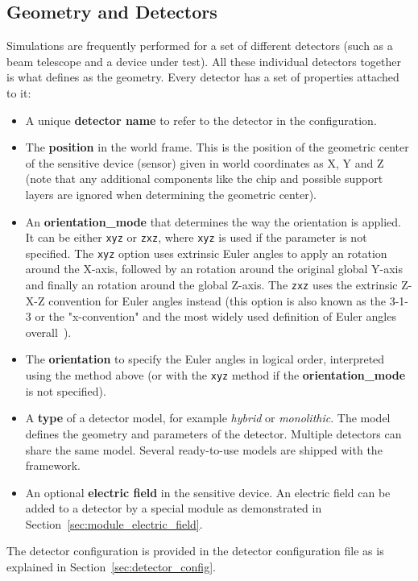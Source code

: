 \subsection{Geometry and Detectors}
\label{sec:models_geometry}
Simulations are frequently performed for a set of different detectors (such as a beam telescope and a device under test).
All these individual detectors together is what \apsq defines as the geometry.
Every detector has a set of properties attached to it:
\begin{itemize}
\item A unique \textbf{detector name} to refer to the detector in the configuration.
\item The \textbf{position} in the world frame.
This is the position of the geometric center of the sensitive device (sensor) given in world coordinates as X, Y and Z (note that any additional components like the chip and possible support layers are ignored when determining the geometric center).
\item An \textbf{orientation\_mode} that determines the way the orientation is applied.
It can be either \texttt{xyz} or \texttt{zxz}, where \texttt{xyz} is used if the parameter is not specified.
The \texttt{xyz} option uses extrinsic Euler angles to apply an rotation around the X-axis, followed by an rotation around the original global Y-axis and finally an rotation around the global Z-axis.
The \texttt{zxz} uses the extrinsic Z-X-Z convention for Euler angles instead (this option is also known as the 3-1-3 or the "x-convention" and the most widely used definition of Euler angles overall~\cite{eulerangles}).
\item The \textbf{orientation} to specify the Euler angles in logical order, interpreted using the method above (or with the \texttt{xyz} method if the \textbf{orientation\_mode} is not specified).
\item A \textbf{type} of a detector model, for example \emph{hybrid} or \emph{monolithic}.
The model defines the geometry and parameters of the detector.
Multiple detectors can share the same model.
Several ready-to-use models are shipped with the framework.
\item An optional \textbf{electric field} in the sensitive device.
An electric field can be added to a detector by a special module as demonstrated in Section~\ref{sec:module_electric_field}.
\end{itemize}
The detector configuration is provided in the detector configuration file as is explained in Section~\ref{sec:detector_config}.

